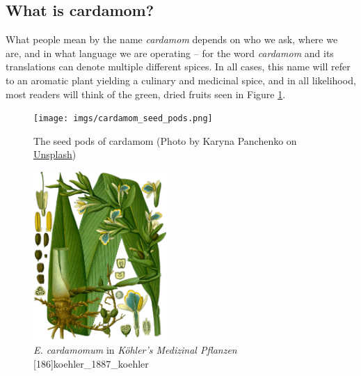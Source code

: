 \documentclass[12pt]{article}
\begin{document}
\subsection{What is cardamom?}

What people mean by the name \textit{cardamom} depends on who we ask, where we are, and in what language we are operating -- for the word \textit{cardamom} and its translations can denote multiple different spices. In all cases, this name will refer to an aromatic plant yielding a culinary and medicinal spice, and in all likelihood, most readers will think of the green, dried fruits seen in Figure \ref{fig:seedpods}.

\begin{figure}[!h]
    \centering
    \texttt{[image: imgs/cardamom\_seed\_pods.png]}
    \caption{The seed pods of cardamom (Photo by Karyna Panchenko on \href{https://unsplash.com/photos/a-pile-of-green-cardamoas-sitting-on-top-of-a-white-table-9_IoYA6EdpY}{Unsplash})}
    \label{fig:seedpods}
\end{figure}



\begin{figure}[!h]
    \centering
    \includegraphics[width=0.45\textwidth]{imgs/cardamom.png}
    \caption{\textit{E. cardamomum} in \textit{Köhler's Medizinal Pflanzen} [186]{koehler_1887_koehler}}
    \label{fig:plant}
\end{figure}
\end{document}
